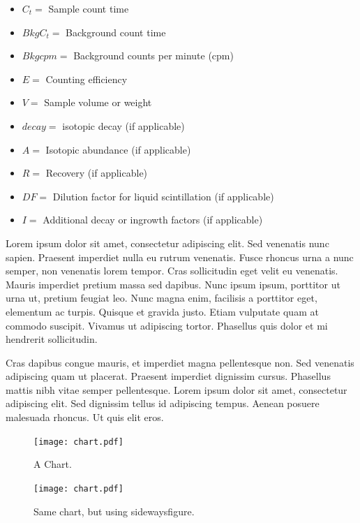\documentclass[double,12pt]{beavtex}
\begin{document}
\begin{itemize}
\item $C_{t} =$ Sample count time
\item $BkgC_{t} =$ Background count time
\item $Bkgcpm =$ Background counts per minute (cpm)
\item $E =$ Counting efficiency
\item $V =$ Sample volume or weight
\item $decay =$ isotopic decay (if applicable)
\item $A =$ Isotopic abundance (if applicable)
\item $R =$ Recovery (if applicable)
\item $DF =$ Dilution factor for liquid scintillation (if applicable)
\item $I =$ Additional decay or ingrowth factors (if applicable)
\end{itemize}

Lorem ipsum dolor sit amet, consectetur adipiscing elit. Sed venenatis nunc sapien. Praesent imperdiet nulla eu rutrum venenatis. Fusce rhoncus urna a nunc semper, non venenatis lorem tempor. Cras sollicitudin eget velit eu venenatis. Mauris imperdiet pretium massa sed dapibus. Nunc ipsum ipsum, porttitor ut urna ut, pretium feugiat leo. Nunc magna enim, facilisis a porttitor eget, elementum ac turpis. Quisque et gravida justo. Etiam vulputate quam at commodo suscipit. Vivamus ut adipiscing tortor. Phasellus quis dolor et mi hendrerit sollicitudin. 

Cras dapibus congue mauris, et imperdiet magna pellentesque non. Sed venenatis adipiscing quam ut placerat. Praesent imperdiet dignissim cursus. Phasellus mattis nibh vitae semper pellentesque. Lorem ipsum dolor sit amet, consectetur adipiscing elit. Sed dignissim tellus id adipiscing tempus. Aenean posuere malesuada rhoncus. Ut quis elit eros.


\pagebreak[4]

\begin{figure}
\begin{center}
	\texttt{[image: chart.pdf]}
	\caption{A Chart.}
	\label{fig:chart}
	\end{center}
\end{figure}

\pagebreak[4]

\begin{figure}
\begin{center}
	\texttt{[image: chart.pdf]}
	\caption{Same chart, but using sidewaysfigure.}
	\label{fig:rain}
	\end{center}
\end{figure}
\end{document}
